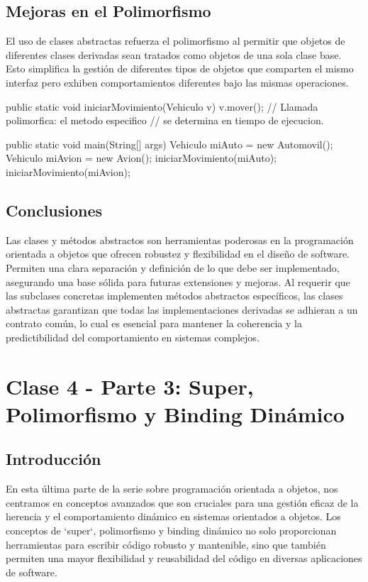 \documentclass[a4paper]{report}
\begin{document}
\section{Mejoras en el Polimorfismo}
El uso de clases abstractas refuerza el polimorfismo al permitir que objetos de diferentes clases derivadas sean tratados como objetos de una sola clase base. Esto simplifica la gestión de diferentes tipos de objetos que comparten el mismo interfaz pero exhiben comportamientos diferentes bajo las mismas operaciones.

\begin{roundedlst}
    public static void iniciarMovimiento(Vehiculo v) {
        v.mover(); 
        // Llamada polimorfica: el metodo especifico
        // se determina en tiempo de ejecucion.
    }

    public static void main(String[] args) {
        Vehiculo miAuto = new Automovil();
        Vehiculo miAvion = new Avion();
        iniciarMovimiento(miAuto);
        iniciarMovimiento(miAvion);
    }

\end{roundedlst}

\section{Conclusiones}
Las clases y métodos abstractos son herramientas poderosas en la programación orientada a objetos que ofrecen robustez y flexibilidad en el diseño de software. Permiten una clara separación y definición de lo que debe ser implementado, asegurando una base sólida para futuras extensiones y mejoras. Al requerir que las subclases concretas implementen métodos abstractos específicos, las clases abstractas garantizan que todas las implementaciones derivadas se adhieran a un contrato común, lo cual es esencial para mantener la coherencia y la predictibilidad del comportamiento en sistemas complejos.

\newpage
\maketitle

\chapter{Clase 4 - Parte 3: Super, Polimorfismo y Binding Dinámico}
\section{Introducción}
En esta última parte de la serie sobre programación orientada a objetos, nos centramos en conceptos avanzados que son cruciales para una gestión eficaz de la herencia y el comportamiento dinámico en sistemas orientados a objetos. Los conceptos de `super`, polimorfismo y binding dinámico no solo proporcionan herramientas para escribir código robusto y mantenible, sino que también permiten una mayor flexibilidad y reusabilidad del código en diversas aplicaciones de software.
\end{document}
